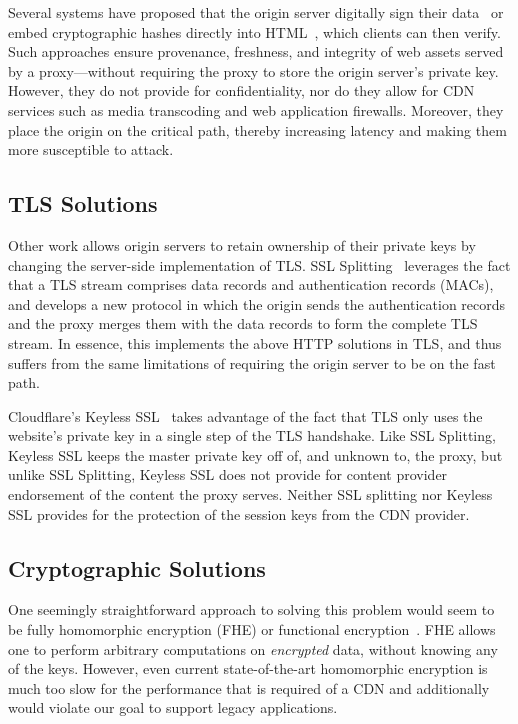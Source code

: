 %
Several systems have proposed that the origin server digitally
sign their data~\cite{cdn-on-demand,stickler} or embed cryptographic hashes
directly into
HTML~\cite{w3c-subresource-integrity,w3c-content-security-policy}, which
clients can then verify.
%
Such approaches ensure provenance, freshness, and integrity of web assets
served by a proxy---without requiring the proxy to store the origin server's
private key.
%
However, they do not provide for confidentiality, nor do they allow for CDN
services such as media transcoding and web application firewalls.
%
Moreover, they place the origin on the critical path, thereby increasing
latency and making them more susceptible to attack.


\subsection{TLS Solutions}
%
Other work allows origin servers to retain ownership of their private keys by
changing the server-side implementation of TLS.
%
SSL Splitting~\cite{ssl-splitting} leverages the fact that a TLS stream
comprises data records and authentication records (MACs), and develops a new
protocol in which the origin sends the authentication records and the proxy
merges them with the data records to form the complete TLS stream.
%
In essence, this implements the above HTTP solutions in TLS, and thus suffers
from the same limitations of requiring the origin server to be on the fast
path.

Cloudflare's Keyless SSL~\cite{keyless-ssl} takes advantage of the fact that
TLS only uses the website's private key in a single step of the TLS handshake.
%
Like SSL Splitting, Keyless SSL keeps the master private key off of, and unknown
to, the proxy, but unlike SSL Splitting, Keyless SSL does not provide for
content provider endorsement of the content the proxy serves.  
%
Neither SSL splitting nor Keyless SSL provides for the protection of the
session keys from the CDN provider.


\subsection{Cryptographic Solutions}
%
One seemingly straightforward approach to solving this problem would seem to be
fully homomorphic encryption (FHE) or functional
encryption~\cite{gentry2009fully, gentry2010computing, garg2016candidate}.
%
FHE allows one to perform arbitrary computations on \textit{encrypted} data,
without knowing any of the keys.  
%
However, even current state-of-the-art homomorphic encryption is much too slow
for the performance that is required of a CDN and additionally would violate
our goal to support legacy applications.


